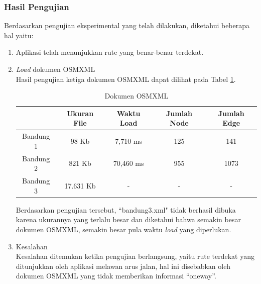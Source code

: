 \subsubsection{Hasil Pengujian}
Berdasarkan pengujian eksperimental yang telah dilakukan, diketahui beberapa hal
yaitu:
\begin{enumerate}
  \item Aplikasi telah menunjukkan rute yang benar-benar terdekat.
  
  \item \textit{Load} dokumen OSMXML\\
  Hasil pengujian ketiga dokumen OSMXML dapat dilihat pada Tabel
  \ref{tab:doc_xml}.
\begin{table}[h]
\centering
\caption{Dokumen OSMXML} 
\label{tab:doc_xml}
\begin{tabular}{|c|c|c|c|c|}
\hline
          & Ukuran File & Waktu Load & Jumlah Node & Jumlah Edge \\ \hline
Bandung 1 & 98 Kb       & 7,710 ms   & 125         & 141         \\ \hline
Bandung 2 & 821 Kb      & 70,460 ms  & 955        & 1073        \\ \hline
Bandung 3 & 17.631 Kb   & -          & -           & -           \\ \hline
\end{tabular}
\end{table}

  Berdasarkan pengujian tersebut, ``bandung3.xml" tidak berhasil dibuka
  karena ukurannya yang terlalu besar dan diketahui bahwa semakin besar dokumen
  OSMXML, semakin besar pula waktu \textit{load} yang diperlukan.
  
  \item Kesalahan\\
  Kesalahan ditemukan ketika pengujian berlangsung, yaitu rute terdekat yang
  ditunjukkan oleh aplikasi melawan arus jalan, hal ini disebabkan oleh dokumen
  OSMXML yang tidak memberikan informasi ``oneway''.
\end{enumerate}











